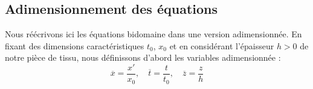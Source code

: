 \message{ !name(main_bidomain.tex)}\documentclass[a4paper]{report}
\begin{document}
\subsection{Adimensionnement des équations}
\label{Adim}

Nous réécrivons ici les équations bidomaine dans une version adimensionnée. En fixant des dimensions caractéristiques $t_0$, $x_0$ et en considérant l'épaisseur $h>0$ de notre pièce de tissu, nous définissons d'abord les variables adimensionnée : 
\[
\overline{x} = \frac{x'}{x_0}, \quad \overline{t} = \frac{t}{t_0}, \quad \overline{z} = \frac{z}{h}
\]

  



\end{document}
